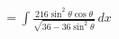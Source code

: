\documentclass[preview]{standalone}
\begin{document}
\begin{align*}
&=\int \frac{216\sin^2\theta\cos\theta}{\sqrt{36-36\sin^2\theta}} \, dx
\end{align*}
\end{document}
